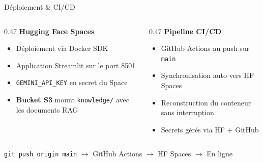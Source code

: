 \documentclass[aspectratio=169, 11pt]{beamer}
\begin{document}
\begin{frame}{Déploiement \& CI/CD}
\vspace{0.1cm}
\small
\begin{columns}[T]
  \begin{column}{0.47\textwidth}
    \textbf{Hugging Face Spaces}
    \begin{itemize}\setlength{\itemsep}{2pt}
      \item Déploiement via Docker SDK
      \item Application Streamlit sur le port 8501
      \item \texttt{GEMINI\_API\_KEY} en secret du Space
      \item \textbf{Bucket S3} mount \texttt{knowledge/} avec les documents RAG
    \end{itemize}
  \end{column}
  \begin{column}{0.47\textwidth}
    \textbf{Pipeline CI/CD}
    \begin{itemize}\setlength{\itemsep}{2pt}
      \item GitHub Actions au push sur \texttt{main}
      \item Synchronisation auto vers HF Spaces
      \item Reconstruction du conteneur sans interruption
      \item Secrets gérés via HF + GitHub
    \end{itemize}
  \end{column}
\end{columns}

\vspace{0.3cm}
\begin{center}
  \colorbox{bglight}{\small\texttt{git push origin main} \;$\rightarrow$\; GitHub Actions \;$\rightarrow$\; HF Spaces \;$\rightarrow$\; En ligne}
\end{center}
\end{frame}
\end{document}
